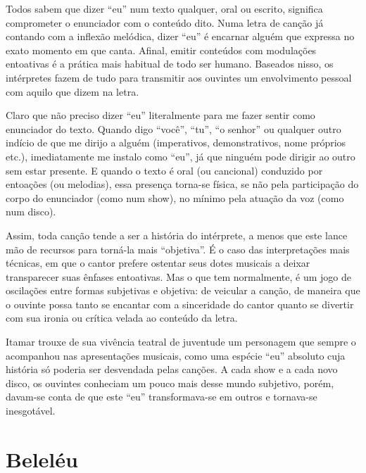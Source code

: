 Todos sabem que dizer ``eu'' num texto qualquer, oral ou escrito,
significa comprometer o enunciador com o conteúdo dito. Numa letra de
canção já contando com a inflexão melódica, dizer ``eu'' é encarnar
alguém que expressa no exato momento em que canta. Afinal, emitir
conteúdos com modulações entoativas é a prática mais habitual de todo
ser humano. Baseados nisso, os intérpretes fazem de tudo para transmitir
aos ouvintes um envolvimento pessoal com aquilo que dizem na letra.

Claro que não preciso dizer ``eu'' literalmente para me fazer sentir
como enunciador do texto. Quando digo ``você'', ``tu'', ``o senhor'' ou
qualquer outro indício de que me dirijo a alguém (imperativos,
demonstrativos, nome próprios etc.), imediatamente me instalo como
``eu'', já que ninguém pode dirigir ao outro sem estar presente. E
quando o texto é oral (ou cancional) conduzido por entoações (ou
melodias), essa presença torna-se física, se não pela participação do
corpo do enunciador (como num show), no mínimo pela atuação da voz (como
num disco).

Assim, toda canção tende a ser a história do intérprete, a menos que
este lance mão de recursos para torná-la mais ``objetiva''. É o caso das
interpretações mais técnicas, em que o cantor prefere ostentar seus
dotes musicais a deixar transparecer suas ênfases entoativas. Mas o que
tem normalmente, é um jogo de oscilações entre formas subjetivas e
objetiva: de veicular a canção, de maneira que o ouvinte possa tanto se
encantar com a sinceridade do cantor quanto se divertir com sua ironia
ou crítica velada ao conteúdo da letra.

Itamar trouxe de sua vivência teatral de juventude um personagem que
sempre o acompanhou nas apresentações musicais, como uma espécie ``eu''
absoluto cuja história só poderia ser desvendada pelas canções. A cada
show e a cada novo disco, os ouvintes conheciam um pouco mais desse
mundo subjetivo, porém, davam-se conta de que este ``eu''
transformava-se em outros e tornava-se inesgotável.

\section{Beleléu}

